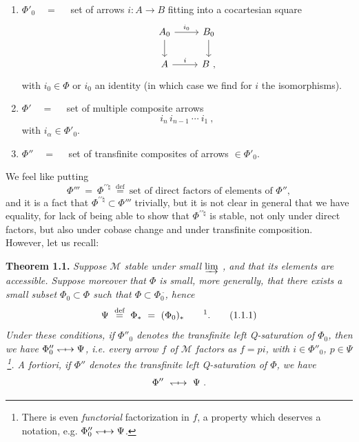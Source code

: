 \documentclass[11pt]{article}
\newcommand{\msp}[1]{\marginpar{\footnotesize [#1]}}
\newcommand{\Qod}{\mathrel{\leftharpoondown\joinrel\relbar\joinrel\rightarrow}}       %
\newcommand{\Qx}[2]{\mathrel{#1\joinrel\mapstochar#2}}
\newcommand{\Qxx}[2]{\mathrel{#1\joinrel\mapstochar\mkern2mu\mapstochar#2}}
\newcommand{\tld}{\tilde{}}   %
\begin{document}
\begin{enumerate}[leftmargin=*]
\item[1)] $\Phi'_0 \quad = \quad$ set of arrows $i : A \longrightarrow B$ fitting into a cocartesian square
\[
\begin{tikzcd}
A_0 \arrow[r, "i_0"] \arrow[d] & B_0 \arrow[d]\\
A \arrow[r, "i"] & B\ ,
\end{tikzcd}
\]
with $i_0 \in \Phi$ or $i_0$ an identity (in which case we find for $i$ the isomorphisms).

\item[2)] $\Phi' \quad = \quad$ set of multiple composite arrows
\[
i_n \, i_{n-1} \ \cdots \ i_1\ ,
\]
with $i_\alpha \in \Phi'_0$.

\item[3)] $\Phi'' \quad = \quad$ set of transfinite composites of arrows $\in \Phi'_0$.
\end{enumerate}

We feel like putting
\[
\Phi''' \ = \ \Phi^{\prime\prime\natural} \ \overset{\text{def}}{=} \ \text{set of direct factors of elements of } \Phi'',
\]
and it is a fact that $\Phi^{\prime\prime\natural} \subset \Phi'''$ trivially, but it is not clear in general that we have %
\msp{page 5}
equality, for lack of being able to show that $\Phi^{\prime\prime\natural}$ is stable, not only under direct factors, but also under cobase change and under transfinite composition. However, let us recall:

\textbf{Theorem 1.1.} \textit{Suppose $\mathcal{M}$ stable under small $\varinjlim$ , and that its elements are accessible. Suppose moreover that $\Phi$ is small, more generally, that there exists a small subset $\Phi_0 \subset \Phi$ such that $\Phi \subset \Phi_0{}^{\tld}$, hence}
\[
\Psi \ \overset{\text{def}}{=} \ \Phi_{*} \ = \ (\Phi_0)_{*} \qquad \text{\footnotemark}.
\tag*{(1.1.1)} %
\]
\footnotetext{\textbf{N.B.} We thus have $\Phi \Qod \Psi$, a fortiori $\Phi_0 \Qod \Psi$.}
\textit{Under these conditions, if $\Phi''_0$ denotes the transfinite left \textup{Q}-saturation of $\Phi_0$, then we have $\Phi''_0 \Qx{\leftharpoondown}{\rightarrow} \Psi$, i.e. every arrow $f$ of $\mathcal{M}$ factors as $f = pi$, with $i \in \Phi''_0$, $p \in \Psi$\,\footnote{There is even \textit{functorial} factorization in $f$, a property which deserves a notation, e.g. $\Phi''_0 \Qxx{\leftharpoondown}{\rightarrow} \Psi$.}. A fortiori, if $\Phi''$ denotes the transfinite left \textup{Q}-saturation of $\Phi$, we have} %
\[
\Phi'' \ \Qx{\leftharpoondown}{\rightarrow} \ \Psi\ .
\]
\end{document}
